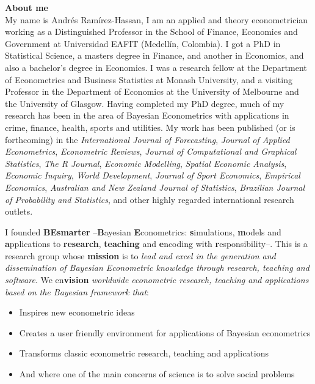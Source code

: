 \textbf{About me}\\
My name is Andrés Ramírez-Hassan, I am an applied and theory econometrician working as a Distinguished Professor in the School of Finance, Economics and Government at Universidad EAFIT (Medellín, Colombia). I got a PhD in Statistical Science, a masters degree in Finance, and another in Economics, and also a bachelor’s degree in Economics. I was a research fellow at the Department of Econometrics and Business Statistics at Monash University, and a visiting Professor in the Department of Economics at the University of Melbourne and the University of Glasgow. Having completed my PhD degree, much of my research has been in the area of Bayesian Econometrics with applications in crime, finance, health, sports and utilities. My work has been published  (or is forthcoming) in the \textit{International Journal of Forecasting}, \textit{Journal of Applied Econometrics}, \textit{Econometric Reviews}, \textit{Journal of Computational and Graphical Statistics}, \textit{The R Journal}, \textit{Economic Modelling}, \textit{Spatial Economic Analysis}, \textit{Economic Inquiry}, \textit{World Development}, \textit{Journal of Sport Economics}, \textit{Empirical Economics}, \textit{Australian and New Zealand Journal of Statistics}, \textit{Brazilian Journal of Probability and Statistics}, and other highly regarded international research outlets.

I founded \textbf{BEsmarter} --\textbf{B}ayesian \textbf{E}conometrics: \textbf{s}imulations, \textbf{m}odels and \textbf{a}pplications to \textbf{research}, \textbf{teaching} and \textbf{e}ncoding with \textbf{r}esponsibility--. This is a research group whose \textbf{mission} is to \textit{lead and excel in the generation and dissemination of Bayesian Econometric knowledge through research, teaching and software}. We en\textbf{vision} \textit{worldwide econometric research, teaching and applications based on the Bayesian framework that}:

\begin{itemize}
	\item Inspires new econometric ideas
	\item Creates a user friendly environment for applications of Bayesian econometrics
	\item Transforms classic econometric research, teaching and applications
	\item And where one of the main concerns of science is to solve social problems    
\end{itemize}

